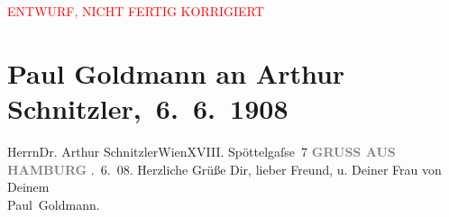 
\begin{center}
            \textcolor{red}{ENTWURF, NICHT FERTIG KORRIGIERT}
                      \end{center}
            
         
         \renewcommand{\erwaehntePersonen}{Personen: Olga Schnitzler}
         \renewcommand{\erwaehnteOrte}{Orte: Edmund-Weiß-Gasse, Hamburg, Wien}
         \renewcommand{\erwaehnteWerke}{}
               \section[ Paul Goldmann an Arthur Schnitzler, 6. 6. 1908]{ Paul Goldmann an Arthur Schnitzler, 6. 6. 1908}\nopagebreak{}\rehead{ }\begin{ledgroupsized}[t]{13cm}\normalsize\beginnumbering \toendnotes[C]{\smallbreak\pagebreak[2]} 
\toendnotes[C]{\smallbreak}\pstart{}{\pb}Herrn\pend{}\pstart{}Dr. Arthur Schnitzler\pend{}\pstart{}Wien\pend{}\pstart{}XVIII. Spöttelgaſse 7\pend{}{\bigskip}\pstart
           \noindent{}{\pb}\textcolor{gray}{\textbf{GRUSS AUS HAMBURG}}\pend
           . 6. 08.\pend
           \pstart
           Herzliche Grüße Dir, lieber Freund, u. Deiner Frau von Deinem {\\}\spacefill\mbox{Paul Goldmann.}\pend
           
         
         \endnumbering{}\end{ledgroupsized}\begin{anhang}\end{anhang}\newcommand{\dateiname}{L03462}\newcommand{\titel}{Paul Goldmann an Arthur Schnitzler, 6. 6. 1908}\newcommand{\editorInnen}{Martin Anton Müller und Laura Untner}
      